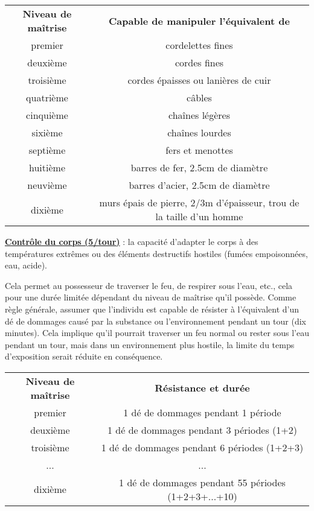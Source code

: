 \bigskip

\begin{tabular}{cc}
\textbf{Niveau de maîtrise} & \textbf{Capable de manipuler l'équivalent de} \\
premier    & cordelettes fines \\
deuxième   & cordes fines \\
troisième  & cordes épaisses ou lanières de cuir\\
quatrième  & câbles \\
cinquième  & chaînes légères \\
sixième    & chaînes lourdes \\
septième   & fers et menottes\\
huitième   & barres de fer, 2.5cm de diamètre\\
neuvième   & barres d'acier, 2.5cm de diamètre \\
dixième    & murs épais de pierre, 2/3m d'épaisseur, trou de la taille d'un homme \\
\end{tabular}

\bigskip

\label{guerrier-controle-corps}\textbf{\uline{Contrôle du corps (5/tour)}} : la capacité d'adapter le corps à des températures extrêmes ou des éléments destructifs hostiles (fumées empoisonnées, eau, acide).

\bigskip

Cela permet au possesseur de traverser le feu, de respirer sous l'eau, etc., cela pour une durée limitée dépendant du niveau de maîtrise qu'il possède. Comme règle générale, assumer que l'individu est capable de résister à l'équivalent d'un dé de dommages causé par la substance ou l'environnement pendant un tour (dix minutes). Cela implique qu'il pourrait traverser un feu normal ou rester sous l'eau pendant un tour, mais dans un environnement plus hostile, la limite du temps d'exposition serait réduite en conséquence.

\bigskip

\begin{tabular}{cc}
\textbf{Niveau de maîtrise} & \textbf{Résistance et durée} \\
premier     & 1 dé de dommages pendant 1 période \\
deuxième    & 1 dé de dommages pendant 3 périodes (1+2) \\
troisième   & 1 dé de dommages pendant 6 périodes (1+2+3) \\
...         & ... \\
dixième     & 1 dé de dommages pendant 55 périodes (1+2+3+...+10) \\
\end{tabular}

